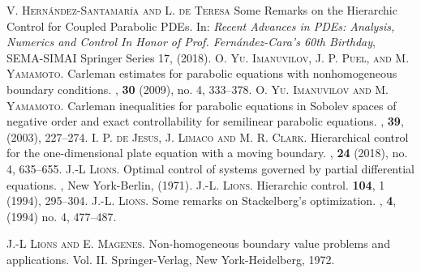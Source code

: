 \documentclass[preprint,10pt]{article}
\numberwithin{equation}{section}
\numberwithin{theorem}{section}
\begin{document}
{\begin{thebibliography}{7}
\textsc{V. Hern\'andez-Santamar\'ia and L. de Teresa}
\newblock Some Remarks on the Hierarchic Control for Coupled Parabolic PDEs.
\newblock In: {\em Recent Advances in PDEs: Analysis, Numerics and Control
In Honor of Prof. Fern\'andez-Cara's 60th Birthday}, SEMA-SIMAI Springer Series 17, (2018).
%
\textsc{O. Yu. Imanuvilov, J. P. Puel, and M. Yamamoto.}
\newblock Carleman estimates for parabolic equations with nonhomogeneous boundary conditions. 
, \textbf{30} (2009), no. 4, 333--378.
\textsc{O. Yu. Imanuvilov and M. Yamamoto.}
\newblock Carleman inequalities for parabolic equations in {S}obolev spaces of negative order and exact controllability for semilinear parabolic equations.
, \textbf{39}, (2003), 227--274.
%
\textsc{I. P. de Jesus, J. Limaco and M. R. Clark.}
\newblock Hierarchical control for the one-dimensional plate equation with a moving boundary. 
, \textbf{24} (2018), no. 4, 635--655.
%
%
%
\textsc{J.-L Lions.}
\newblock Optimal control of systems governed by partial differential equations. 
, New York-Berlin, (1971).
%
%
\textsc{J.-L. Lions.}
\newblock Hierarchic control.
 \textbf{104}, 1 (1994), 295--304.
%
\textsc{J.-L. Lions.}
\newblock Some remarks on {S}tackelberg's optimization.
, \textbf{4}, 
  (1994) no. 4, 477--487.
 
\textsc{J.-L Lions and E. Magenes.}
 Non-homogeneous boundary value problems and applications. Vol. II. Springer-Verlag, New York-Heidelberg, 1972.
  

\end{thebibliography}}
\end{document}
